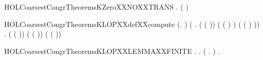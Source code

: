 \newcommand{\HOLCoarsestCongrTheoremsINFINITEXXEXISTSXXLEMMA}{\UseVerbatim{HOLCoarsestCongrTheoremsINFINITEXXEXISTSXXLEMMA}}
\begin{SaveVerbatim}{HOLCoarsestCongrTheoremsKZeroXXNOXXTRANS}
\HOLTokenTurnstile{} \HOLSymConst{\HOLTokenForall{}}  . \HOLSymConst{\HOLTokenNeg{}}(   \HOLTokenTransBegin{}\HOLTokenTransEnd {})
\end{SaveVerbatim}
\newcommand{\HOLCoarsestCongrTheoremsKZeroXXNOXXTRANS}{\UseVerbatim{HOLCoarsestCongrTheoremsKZeroXXNOXXTRANS}}
\begin{SaveVerbatim}{HOLCoarsestCongrTheoremsKLOPXXdefXXcompute}
\HOLTokenTurnstile{} (\HOLSymConst{\HOLTokenForall{}}.    \HOLSymConst{=} ) \HOLSymConst{\HOLTokenConj{}}
   (\HOLSymConst{\HOLTokenForall{}} .
          ( ( )) \HOLSymConst{=}
          ( ( ) \HOLSymConst{-} ) \HOLSymConst{+}
           ( ( ) \HOLSymConst{-} )) \HOLSymConst{\HOLTokenConj{}}
   \HOLSymConst{\HOLTokenForall{}} .
         ( ( )) \HOLSymConst{=}
         ( ( )) \HOLSymConst{+}
          ( ( ))
\end{SaveVerbatim}
\newcommand{\HOLCoarsestCongrTheoremsKLOPXXdefXXcompute}{\UseVerbatim{HOLCoarsestCongrTheoremsKLOPXXdefXXcompute}}
\begin{SaveVerbatim}{HOLCoarsestCongrTheoremsKLOPXXLEMMAXXFINITE}
\HOLTokenTurnstile{} \HOLSymConst{\HOLTokenForall{}} .
         \HOLSymConst{\HOLTokenConj{}}   \HOLSymConst{\HOLTokenImp{}}
       \HOLSymConst{\HOLTokenExists{}}.
             \HOLSymConst{\HOLTokenConj{}} (\HOLSymConst{\HOLTokenForall{}} .  \HOLTokenWeakTransBegin{}\HOLTokenWeakTransEnd {} \HOLSymConst{\HOLTokenImp{}} \HOLSymConst{\HOLTokenNeg{}}  ) \HOLSymConst{\HOLTokenConj{}}
           \HOLSymConst{\HOLTokenForall{}} .  \HOLTokenWeakTransBegin{}\HOLTokenWeakTransEnd {} \HOLSymConst{\HOLTokenImp{}} \HOLSymConst{\HOLTokenNeg{}}  
\end{SaveVerbatim}
